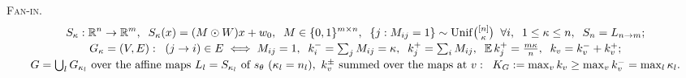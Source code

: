 \documentclass[10pt]{article}
\newcommand{\R}{\mathbb{R}}
\begin{document}
{\vspace{3pt}
{\scshape Fan-in.}
\vspace{-9pt}
\begin{gather*}
S_\kappa:\R^{n}\to\R^{m},\;\; S_\kappa(x)=(M\odot W)x+w_0,\;\; M\in\{0,1\}^{m\times n},\;\; \{j:M_{ij}=1\}\sim\mathrm{Unif}\tbinom{[n]}{\kappa}\;\;\forall i,\;\; 1\le\kappa\le n,\;\; S_n=L_{n\to m};\\[-2pt]
G_\kappa=(V,E):\;\; (j\to i)\in E\iff M_{ij}=1,\;\; k^{-}_i=\textstyle\sum_j M_{ij}=\kappa,\;\; k^{+}_j=\textstyle\sum_i M_{ij},\;\; \mathbb{E}\,k^{+}_j=\tfrac{m\kappa}{n},\;\; k_v=k^{-}_v+k^{+}_v;\\[-2pt]
G=\textstyle\bigcup_l G_{\kappa_l}\ \text{over the affine maps }L_l=S_{\kappa_l}\text{ of }s_\theta\ (\kappa_l=n_l),\ k^{\pm}_v\text{ summed over the maps at }v:\;\; K_G:=\max_{v}k_v\ge\max_{v}k^{-}_v=\max_{l}\kappa_l .
\end{gather*}}
\end{document}
